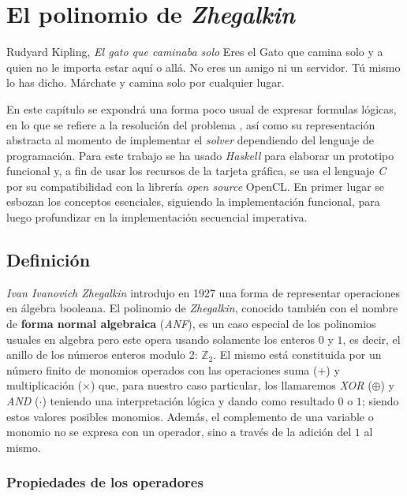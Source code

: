 \chapter{El polinomio de \textit{Zhegalkin}}

\begin{chapquote}{Rudyard Kipling, \textit{El gato que caminaba solo}}
Eres el Gato que camina solo y a quien no le importa estar aquí o allá. No eres un amigo ni un servidor. Tú mismo lo has dicho. Márchate y camina solo por cualquier lugar.
\end{chapquote}

En este capítulo se expondrá una forma poco usual de expresar formulas lógicas, en lo que se refiere a la resolución del problema \sat, así como su representación abstracta al momento de implementar el \textit{solver} dependiendo del lenguaje de programación. Para este trabajo se ha usado \textit{Haskell} para elaborar un prototipo funcional y, a fin de usar los recursos de la tarjeta gráfica, se usa el lenguaje \textit{C} por su compatibilidad con la librería \textit{open source} OpenCL. En primer lugar se esbozan los conceptos esenciales, siguiendo la implementación funcional, para luego profundizar en la implementación secuencial imperativa.

\section{Definición}

\emph{Ivan Ivanovich Zhegalkin} introdujo en 1927 una forma de representar operaciones en álgebra booleana\cite{zhegalkin}. El polinomio de \textit{Zhegalkin}, conocido también con el nombre de \textbf{forma normal algebraica} (\textit{ANF}), es un caso especial de los polinomios usuales en algebra pero este opera usando solamente los enteros $0$ y $1$, es decir, el anillo de los números enteros modulo 2: $\mathbb{Z}_2$. El mismo está constituida por un número finito de monomios operados con las operaciones suma (+) y multiplicación ($\times$) que, para nuestro caso particular, los llamaremos \textit{XOR} ($\oplus$) y \textit{AND} ($\cdot$) teniendo una interpretación lógica y dando como resultado $0$ o $1$; siendo estos valores posibles monomios. Además, el complemento de una variable o monomio no se expresa con un operador, sino a través de la adición del $1$ al mismo.

\subsection{Propiedades de los operadores}

